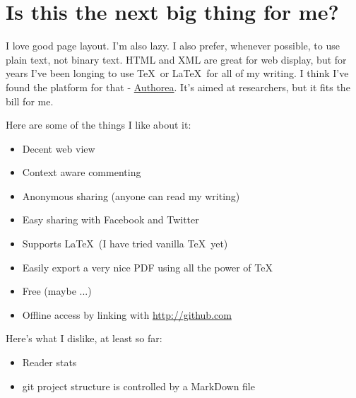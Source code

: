 \section{Is this the next big thing for me?}
I love good page layout.  I'm also lazy.  I also prefer, whenever possible, to use plain text, not binary text.  HTML and XML are great for web display, but for years I've been longing to use \TeX\ or \LaTeX\ for all of my writing.  I think I've found the platform for that - \href{http://www.authorea.com}{Authorea}.  It's aimed at researchers, but it fits the bill for me.

Here are some of the things I like about it:

\begin{itemize}
\item Decent web view
\item Context aware commenting
\item Anonymous sharing (anyone can read my writing)
\item Easy sharing with Facebook and Twitter
\item Supports \LaTeX\ (I have tried vanilla \TeX\ yet)
\item Easily export a very nice PDF using all the power of \TeX
\item Free (maybe ...)
\item Offline access by linking with \url{http://github.com}
\end{itemize}

Here's what I dislike, at least so far:

\begin{itemize}
\item Reader stats
\item git project structure is controlled by a MarkDown file
\end{itemize}